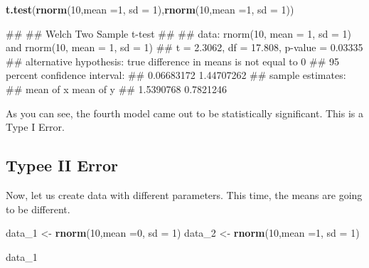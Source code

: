 \documentclass[
]{book}
\newenvironment{Shaded}{\begin{snugshade}}{\end{snugshade}}
\newcommand{\AttributeTok}[1]{\textcolor[rgb]{0.13,0.29,0.53}{#1}}
\newcommand{\DecValTok}[1]{\textcolor[rgb]{0.00,0.00,0.81}{#1}}
\newcommand{\FunctionTok}[1]{\textcolor[rgb]{0.13,0.29,0.53}{\textbf{#1}}}
\newcommand{\NormalTok}[1]{#1}
\newcommand{\OtherTok}[1]{\textcolor[rgb]{0.56,0.35,0.01}{#1}}
\begin{document}
\begin{Shaded}
\begin{Highlighting}[]
\FunctionTok{t.test}\NormalTok{(}\FunctionTok{rnorm}\NormalTok{(}\DecValTok{10}\NormalTok{,}\AttributeTok{mean =}\DecValTok{1}\NormalTok{, }\AttributeTok{sd =} \DecValTok{1}\NormalTok{),}\FunctionTok{rnorm}\NormalTok{(}\DecValTok{10}\NormalTok{,}\AttributeTok{mean =}\DecValTok{1}\NormalTok{, }\AttributeTok{sd =} \DecValTok{1}\NormalTok{))}
\end{Highlighting}
\end{Shaded}

\begin{Shaded}
\begin{Highlighting}[]
\NormalTok{\#\# }
\NormalTok{\#\#  Welch Two Sample t{-}test}
\NormalTok{\#\# }
\NormalTok{\#\# data:  rnorm(10, mean = 1, sd = 1) and rnorm(10, mean = 1, sd = 1)}
\NormalTok{\#\# t = 2.3062, df = 17.808, p{-}value = 0.03335}
\NormalTok{\#\# alternative hypothesis: true difference in means is not equal to 0}
\NormalTok{\#\# 95 percent confidence interval:}
\NormalTok{\#\#  0.06683172 1.44707262}
\NormalTok{\#\# sample estimates:}
\NormalTok{\#\# mean of x mean of y }
\NormalTok{\#\# 1.5390768 0.7821246}
\end{Highlighting}
\end{Shaded}

As you can see, the fourth model came out to be statistically significant. This is a Type I Error.

\hypertarget{typee-ii-error}{%
\subsection{Typee II Error}\label{typee-ii-error}}

Now, let us create data with different parameters. This time, the means are going to be different.

\begin{Shaded}
\begin{Highlighting}[]
\NormalTok{data\_1 }\OtherTok{\textless{}{-}} \FunctionTok{rnorm}\NormalTok{(}\DecValTok{10}\NormalTok{,}\AttributeTok{mean =}\DecValTok{0}\NormalTok{, }\AttributeTok{sd =} \DecValTok{1}\NormalTok{)}
\NormalTok{data\_2 }\OtherTok{\textless{}{-}} \FunctionTok{rnorm}\NormalTok{(}\DecValTok{10}\NormalTok{,}\AttributeTok{mean =}\DecValTok{1}\NormalTok{, }\AttributeTok{sd =} \DecValTok{1}\NormalTok{)}

\NormalTok{data\_1}
\end{Highlighting}
\end{Shaded}
\end{document}
